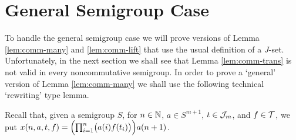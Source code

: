 \section{General Semigroup Case}
To handle the general semigroup case we will prove versions of Lemma \ref{lem:comm-many} and \ref{lem:comm-lift} that use the usual definition of a $J$-set. 
Unfortunately, in the next section we shall see that Lemma \ref{lem:comm-trans} is not valid in every noncommutative semigroup. 
In order to prove a `general' version of Lemma \ref{lem:comm-many} we shall use the following technical `rewriting' type lemma.

Recall that, given a semigroup $S$, for $n \in \mathbb{N}$, $a \in S^{m+1}$, $t \in \mathcal{J}_m$, and $f \in \mathcal{T}$, we put $x(n, a, t, f) = \Bigl( \prod_{i=1}^n \bigl( a(i) f(t_i) \bigr) \Bigr) a(n+1)$. 

